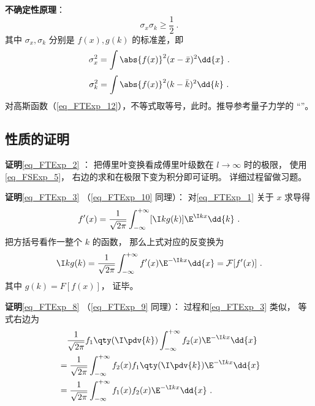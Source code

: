 \textbf{不确定性原理}：
\begin{equation}
\sigma_x \sigma_k \geqslant \frac{1}{2}~.
\end{equation}
其中 $\sigma_x, \sigma_k$ 分别是 $f(x), g(k)$ 的标准差，即
\begin{equation}
\sigma_x^2 = \int \abs{f(x)}^2 (x-\bar x)^2 \dd{x}~.
\end{equation}
\begin{equation}
\sigma_k^2 = \int \abs{f(x)}^2 (k-\bar k)^2 \dd{k}~.
\end{equation}
对高斯函数（\autoref{eq_FTExp_12}），不等式取等号，此时。推导参考量子力学的 “”。

\subsection{性质的证明}

\textbf{证明}\autoref{eq_FTExp_2} ： 把傅里叶变换看成傅里叶级数在 $l \to \infty$ 时的极限， 使用\autoref{eq_FSExp_5}， 右边的求和在极限下变为积分即可证明。 详细过程留做习题。

\textbf{证明}\autoref{eq_FTExp_3} （\autoref{eq_FTExp_10} 同理）： 对\autoref{eq_FTExp_1} 关于 $x$ 求导得
\begin{equation}
f'(x) = \frac{1}{\sqrt{2\pi }} \int_{-\infty }^{+\infty } [\I kg(k)]\E^{\I kx} \dd{k}~.
\end{equation}
把方括号看作一整个 $k$ 的函数， 那么上式对应的反变换为
\begin{equation}
\I kg(k) = \frac{1}{\sqrt{2\pi }} \int_{-\infty }^{+\infty } f'(x) \E^{-\I kx} \dd{x} = \mathcal F [f'(x)]~.
\end{equation}
其中 $g(k) = F [f(x)]$， 证毕。

\textbf{证明}\autoref{eq_FTExp_8} （\autoref{eq_FTExp_9} 同理）： 过程和\autoref{eq_FTExp_3} 类似， 等式右边为
\begin{equation}
\begin{aligned}
& \quad \frac{1}{\sqrt{2\pi }} f_1\qty(\I \pdv{k}) \int_{-\infty }^{+\infty } f_2(x)\E^{-\I kx} \dd{x}\\
&= \frac{1}{\sqrt{2\pi }} \int_{-\infty }^{+\infty } f_2(x) f_1\qty(\I \pdv{k})\E^{-\I kx} \dd{x}\\
&= \frac{1}{\sqrt{2\pi }} \int_{-\infty }^{+\infty } f_1(x) f_2(x) \E^{-\I kx} \dd{x}~.
\end{aligned}
\end{equation}
